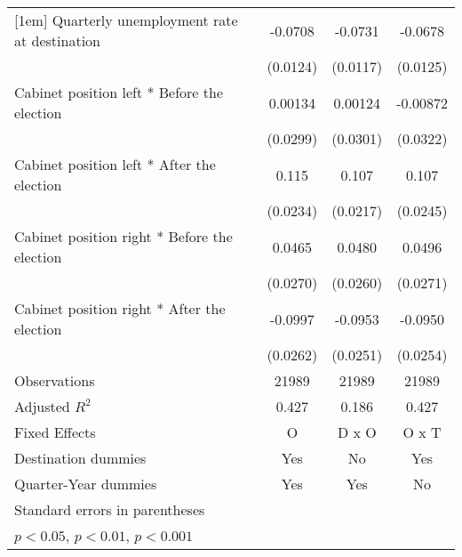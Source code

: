 \begin{table}[htbp]
\begin{tabular}{l*{3}{c}}
[1em]
Quarterly unemployment rate at destination&     -0.0708\sym{***}&     -0.0731\sym{***}&     -0.0678\sym{***}\\
                    &    (0.0124)         &    (0.0117)         &    (0.0125)         \\
[1em]
Cabinet position left * Before the election&     0.00134         &     0.00124         &    -0.00872         \\
                    &    (0.0299)         &    (0.0301)         &    (0.0322)         \\
[1em]
Cabinet position left * After the election&       0.115\sym{***}&       0.107\sym{***}&       0.107\sym{***}\\
                    &    (0.0234)         &    (0.0217)         &    (0.0245)         \\
[1em]
Cabinet position right * Before the election&      0.0465         &      0.0480         &      0.0496         \\
                    &    (0.0270)         &    (0.0260)         &    (0.0271)         \\
[1em]
Cabinet position right * After the election&     -0.0997\sym{***}&     -0.0953\sym{***}&     -0.0950\sym{***}\\
                    &    (0.0262)         &    (0.0251)         &    (0.0254)         \\
\hline
Observations        &       21989         &       21989         &       21989         \\
Adjusted \(R^{2}\)  &       0.427         &       0.186         &       0.427         \\
Fixed Effects       &           O         &       D x O         &       O x T         \\
Destination dummies &         Yes         &          No         &         Yes         \\
Quarter-Year dummies&         Yes         &         Yes         &          No         \\
\hline\hline
\multicolumn{4}{l}{\footnotesize Standard errors in parentheses}\\
\multicolumn{4}{l}{\footnotesize \sym{*} \(p<0.05\), \sym{**} \(p<0.01\), \sym{***} \(p<0.001\)}\\
\end{tabular}
\end{table}
